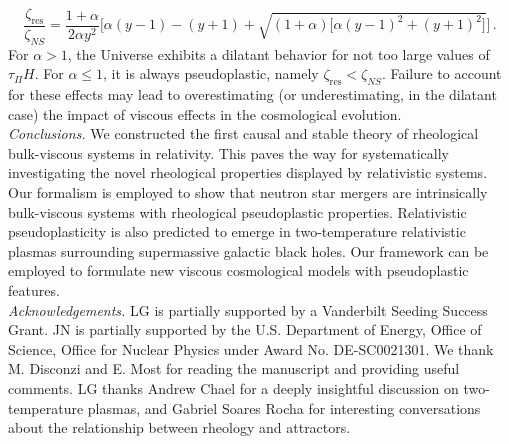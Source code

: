 \documentclass[aps,prl,noshowpacs,noshowkeys,floatfix,superscriptaddress,singlecolum,nofootinbib]{revtex4-2}
\theoremstyle{definition}
\theoremstyle{theorem}
\begin{document}
\begin{equation}\label{pseudouniverse}
    \dfrac{\zeta_{\text{res}}}{\zeta_{NS}} = \dfrac{1{+}\alpha}{2\alpha y^2} \bigg[\alpha (y{-}1) {-}(y{+}1){+}\sqrt{(1{+}\alpha) \big[\alpha (y{-}1)^2+(y{+}1)^2 \big]} \bigg] \, .
\end{equation}
For $\alpha>1$, the Universe exhibits a dilatant behavior for not too large values of $\tau_\Pi H$. For $\alpha \leq 1$, it is always pseudoplastic, namely $\zeta_{\text{res}}<\zeta_{NS}$. Failure to account for these effects may lead to overestimating (or underestimating, in the dilatant case) the impact of viscous effects in the cosmological evolution.\\

\noindent \textit{Conclusions.} We constructed the first causal and stable theory of rheological bulk-viscous systems in relativity. This paves the way for systematically investigating the novel rheological properties displayed by relativistic systems. Our formalism is employed to show that neutron star mergers are intrinsically bulk-viscous systems with rheological pseudoplastic properties. Relativistic pseudoplasticity is also predicted to emerge in two-temperature relativistic plasmas surrounding supermassive galactic black holes. Our framework can be employed to formulate new viscous cosmological models with pseudoplastic features.\\ 


\noindent
\textit{Acknowledgements.}
LG is partially supported by a Vanderbilt Seeding Success Grant. JN is partially supported by the U.S. Department of Energy, Office of Science, Office for Nuclear Physics under Award No. DE-SC0021301. We thank M. Disconzi and E. Most for reading the manuscript and providing useful comments. LG thanks  Andrew Chael for a deeply insightful discussion on two-temperature plasmas, and Gabriel Soares Rocha for interesting conversations about the relationship between rheology and attractors.
\end{document}
